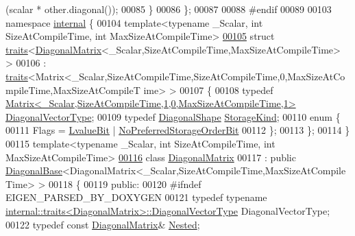 \begin{DoxyCode}
      (scalar * other.diagonal());
00085     \}
00086 \};
00087 
00088 \textcolor{preprocessor}{#endif}
00089 
00103 \textcolor{keyword}{namespace }\hyperlink{namespaceinternal}{internal} \{
00104 \textcolor{keyword}{template}<\textcolor{keyword}{typename} \_Scalar, \textcolor{keywordtype}{int} SizeAtCompileTime, \textcolor{keywordtype}{int} MaxSizeAtCompileTime>
\hyperlink{struct_eigen_1_1internal_1_1traits_3_01_diagonal_matrix_3_01___scalar_00_01_size_at_compile_timeb0b2868b66e3b20cd28c00acb4409967}{00105} \textcolor{keyword}{struct }\hyperlink{struct_eigen_1_1internal_1_1traits}{traits}<\hyperlink{group___core___module_class_eigen_1_1_diagonal_matrix}{DiagonalMatrix}<\_Scalar,SizeAtCompileTime,MaxSizeAtCompileTime> >
00106  : \hyperlink{struct_eigen_1_1internal_1_1traits}{traits}<Matrix<\_Scalar,SizeAtCompileTime,SizeAtCompileTime,0,MaxSizeAtCompileTime,MaxSizeAtCompileT
      ime> >
00107 \{
00108   \textcolor{keyword}{typedef} \hyperlink{group___core___module_class_eigen_1_1_matrix}{Matrix<\_Scalar,SizeAtCompileTime,1,0,MaxSizeAtCompileTime,1>}
       \hyperlink{group___core___module_class_eigen_1_1_matrix}{DiagonalVectorType};
00109   \textcolor{keyword}{typedef} \hyperlink{struct_eigen_1_1_diagonal_shape}{DiagonalShape} \hyperlink{struct_eigen_1_1_diagonal_shape}{StorageKind};
00110   \textcolor{keyword}{enum} \{
00111     Flags = \hyperlink{group__flags_gae2c323957f20dfdc6cb8f44428eaec1a}{LvalueBit} | \hyperlink{group__flags_ga3c186ad80ddcf5e2ed3d7ee31cca1860}{NoPreferredStorageOrderBit}
00112   \};
00113 \};
00114 \}
00115 \textcolor{keyword}{template}<\textcolor{keyword}{typename} \_Scalar, \textcolor{keywordtype}{int} SizeAtCompileTime, \textcolor{keywordtype}{int} MaxSizeAtCompileTime>
\hyperlink{group___core___module}{00116} \textcolor{keyword}{class }\hyperlink{group___core___module_class_eigen_1_1_diagonal_matrix}{DiagonalMatrix}
00117   : \textcolor{keyword}{public} \hyperlink{class_eigen_1_1_diagonal_base}{DiagonalBase}<DiagonalMatrix<\_Scalar,SizeAtCompileTime,MaxSizeAtCompileTime> >
00118 \{
00119   \textcolor{keyword}{public}:
00120 \textcolor{preprocessor}{    #ifndef EIGEN\_PARSED\_BY\_DOXYGEN}
00121     \textcolor{keyword}{typedef} \textcolor{keyword}{typename} \hyperlink{struct_eigen_1_1internal_1_1traits}{internal::traits<DiagonalMatrix>::DiagonalVectorType}
       DiagonalVectorType;
00122     \textcolor{keyword}{typedef} \textcolor{keyword}{const} \hyperlink{group___core___module_class_eigen_1_1_diagonal_matrix}{DiagonalMatrix}& \hyperlink{group___core___module_class_eigen_1_1_diagonal_matrix}{Nested};

\end{DoxyCode}
